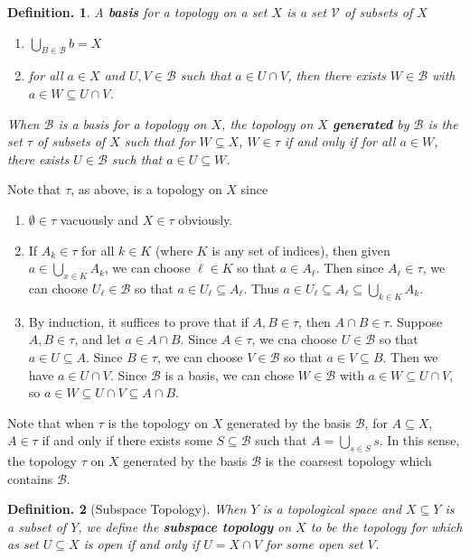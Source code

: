 \documentclass[11pt, a4paper]{memoir}
\theoremstyle{change}
\theoremstyle{plain}
\theoremstyle{nonumberplain}
\newtheorem{definition}{Definition.}
\numberwithin{equation}{section}
\begin{document}
\begin{definition}
    A \textbf{basis} for a topology on a set $X$ is a set $\mathcal{V}$ of subsets of $X$
    \begin{enumerate}[nl,r]
        \item $\bigcup_{B\in \mathcal{B}}b=X$
        \item for all $a\in X$ and $U,V\in\mathcal{B}$ such that $a\in U\cap V$, then there exists $W\in\mathcal{B}$ with $a\in W\subseteq U\cap V$.
    \end{enumerate}
    When $\mathcal{B}$ is a basis for a topology on $X$, the topology on $X$ \textbf{generated} by $\mathcal{B}$ is the set $\tau$ of subsets of $X$ such that for $W\subseteq X$, $W\in\tau$ if and only if for all $a\in W$, there exists $U\in \mathcal{B}$ such that $a\in U\subseteq W$.
\end{definition}
Note that $\tau$, as above, is a topology on $X$ since
\begin{enumerate}[nl,r]
    \item $\emptyset\in\tau$ vacuously and $X\in\tau$ obviously.
    \item If $A_k\in\tau$ for all $k\in K$ (where $K$ is any set of indices), then given $a\in\bigcup_{x\in K}A_k$, we can choose $\ell\in K$ so that $a\in A_\ell$.
        Then since $A_\ell\in\tau$, we can choose $U_\ell\in\mathcal{B}$ so that $a\in U_\ell\subseteq A_\ell$.
        Thus $a\in U_\ell\subseteq A_\ell\subseteq\bigcup_{k\in K}A_k$.
    \item By induction, it suffices to prove that if $A,B\in\tau$, then $A\cap B\in\tau$.
        Suppose $A,B\in\tau$, and let $a\in A\cap B$.
        Since $A\in\tau$, we cna choose $U\in\mathcal{B}$ so that $a\in U\subseteq A$.
        Since $B\in\tau$, we can choose $V\in\mathcal{B}$ so that $a\in V\subseteq B$.
        Then we have $a\in U\cap V$.
        Since $\mathcal{B}$ is a basis, we can chose $W\in\mathcal{B}$ with $a\in W\subseteq U\cap V$, so $a\in W\subseteq U\cap V\subseteq A\cap B$.
\end{enumerate}
Note that when $\tau$ is the topology on $X$ generated by the basis $\mathcal{B}$, for $A\subseteq X$, $A\in\tau$ if and only if there exists some $S\subseteq\mathcal{B}$ such that $A=\bigcup_{s\in S}s$.
In this sense, the topology $\tau$ on $X$ generated by the basis $\mathcal{B}$ is the coarsest topology which contains $\mathcal{B}$.
\begin{definition}[Subspace Topology]
    When $Y$ is a topological space and $X\subseteq Y$ is a subset of $Y$, we define the \textbf{subspace topology} on $X$ to be the topology for which as set $U\subseteq X$ is open if and only if $U=X\cap V$ for some open set $V$.
\end{definition}
\end{document}
